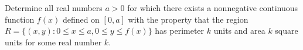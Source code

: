 Determine all real numbers $a>0$ for which there exists a nonnegative continuous function $f(x)$ defined on $[0,a]$ with the property that the region
$R=\{(x,y): 0\le x\le a, 0\le y\le f(x)\}$
has perimeter $k$ units and area $k$ square units for some real number $k$.